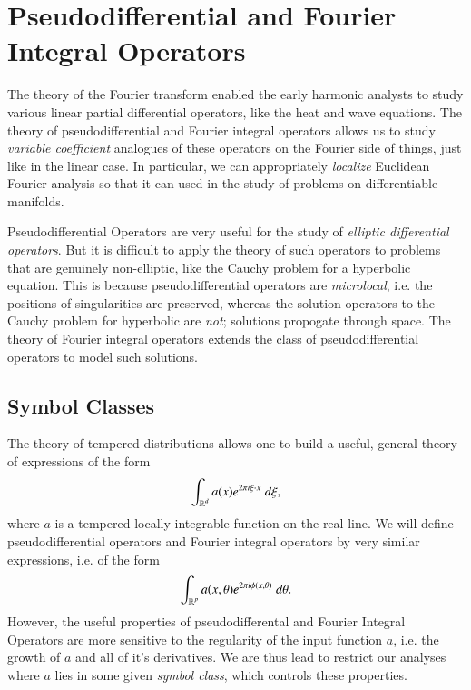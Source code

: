 
\part{Pseudodifferential and Fourier Integral Operators}

The theory of the Fourier transform enabled the early harmonic analysts to study various linear partial differential operators, like the heat and wave equations. The theory of pseudodifferential and Fourier integral operators allows us to study \emph{variable coefficient} analogues of these operators on the Fourier side of things, just like in the linear case. In particular, we can appropriately \emph{localize} Euclidean Fourier analysis so that it can used in the study of problems on differentiable manifolds.

Pseudodifferential Operators are very useful for the study of \emph{elliptic differential operators}. But it is difficult to apply the theory of such operators to problems that are genuinely non-elliptic, like the Cauchy problem for a hyperbolic equation. This is because pseudodifferential operators are \emph{microlocal}, i.e. the positions of singularities are preserved, whereas the solution operators to the Cauchy problem for hyperbolic are \emph{not}; solutions propogate through space. The theory of Fourier integral operators extends the class of pseudodifferential operators to model such solutions.



\chapter{Symbol Classes}

The theory of tempered distributions allows one to build a useful, general theory of expressions of the form
%
\[ \int_{\operatorname{\mathbb{R}}^d} a(x) e^{2 \pi i \xi \cdot x}\; d\xi, \]
%
where $a$ is a tempered locally integrable function on the real line. We will define pseudodifferential operators and Fourier integral operators by very similar expressions, i.e. of the form
%
\[ \int_{\operatorname{\mathbb{R}}^p} a(x,\theta) e^{2 \pi i \phi(x,\theta)}\; d\theta. \]
%
However, the useful properties of pseudodifferental and Fourier Integral Operators are more sensitive to the regularity of the input function $a$, i.e. the growth of $a$ and all of it's derivatives. We are thus lead to restrict our analyses where $a$ lies in some given \emph{symbol class}, which controls these properties.

